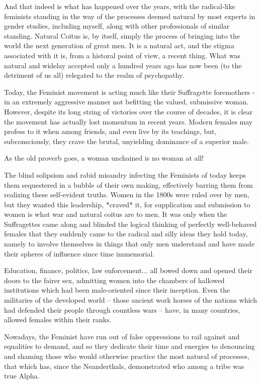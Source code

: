 And that indeed is what has happened over the years, with the radical-like feminists standing in the way of 
the processes deemed natural by most experts in gender studies, including myself, along with other professionals 
of similar standing. Natural Coitus is, by itself, simply the process of bringing into the world the next generation 
of great men. It is a natural act, and the stigma associated with it is, from a historal point of view, a recent thing. 
What was natural and widelay accepted only a hundred years ago has now been (to the detriment of us all) relegated to 
the realm of psychopathy.

Today, the Feminist movement is acting much like their Suffragette foremothers - in an extremely aggressive 
manner not befitting the valued, submissive woman. However, despite its long string of victories over the 
course of decades, it is clear the movement has actually lost momentum in recent years. Modern females 
may profess to it when among friends, and even live by its teachings, but, subconsciously, they crave 
the brutal, unyielding dominance of a superior male.

As the old proverb goes, a woman unchained is no woman at all!

The blind solipsism and rabid misandry infecting the Feminists of today keeps them sequestered in a bubble 
of their own making, effectively barring them from realizing these self-evident truths. Women in the 1800s 
were ruled over by men, but they wanted this leadership, *craved* it, for supplication and submission to 
women is what war and natural coitus are to men. It was only when the Suffragettes came along and blinded 
the logical thinking of perfectly well-behaved females that they suddenly came to the radical and silly 
ideas they hold today, namely to involve themselves in things that only men understand and have made 
their spheres of influence since time immemorial. 

Education, finance, politics, law enforcement... all bowed down and opened their doors to the fairer sex, 
admitting women into the chambers of hallowed institutions which had been male-oriented since their inception. 
Even the militaries of the developed world -- those ancient work horses of the nations which had defended their 
people through countless wars -- have, in many countries, allowed females within their ranks.

Nowadays, the Feminist have run out of false oppressions to rail against and equalities to demand, and so 
they dedicate their time and energies to denouncing and shaming those who would otherwise practice the most 
natural of processes, that which has, since the Neanderthals, demonstrated who among a tribe was true Alpha.

